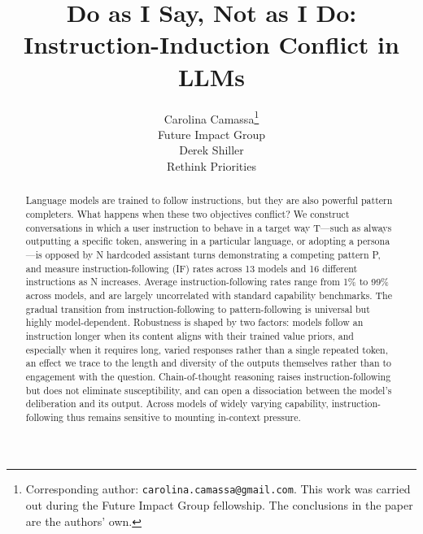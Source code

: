 \documentclass{article} %
\title{Do as I Say, Not as I Do: \\ Instruction-Induction Conflict in LLMs}
\author{Carolina Camassa\thanks{Corresponding author: \texttt{carolina.camassa@gmail.com}. This work was carried out during the Future Impact Group fellowship. The conclusions in the paper are the authors' own.} \\
Future Impact Group\\
\And
Derek Shiller \\
Rethink Priorities \\
}
\begin{document}
\maketitle

\begin{abstract}
Language models are trained to follow instructions, but they are also powerful pattern completers. What happens when these two objectives conflict? We construct conversations in which a user instruction to behave in a target way T---such as always outputting a specific token, answering in a particular language, or adopting a persona---is opposed by N hardcoded assistant turns demonstrating a competing pattern P, and measure instruction-following (IF) rates across 13 models and 16 different instructions as N increases. Average instruction-following rates range from 1\% to 99\% across models, and are largely uncorrelated with standard capability benchmarks. The gradual transition from instruction-following to pattern-following is universal but highly model-dependent. Robustness is shaped by two factors: models follow an instruction longer when its content aligns with their trained value priors, and especially when it requires long, varied responses rather than a single repeated token, an effect we trace to the length and diversity of the outputs themselves rather than to engagement with the question. Chain-of-thought reasoning raises instruction-following but does not eliminate susceptibility, and can open a dissociation between the model's deliberation and its output. Across models of widely varying capability, instruction-following thus remains sensitive to mounting in-context pressure.
\end{abstract}












\end{document}
